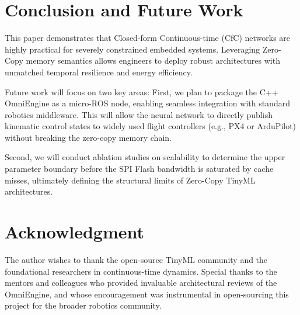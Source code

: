 \documentclass[conference]{IEEEtran}
\begin{document}
\section{Conclusion and Future Work}
This paper demonstrates that Closed-form Continuous-time (CfC) networks are highly practical for severely constrained embedded systems. Leveraging Zero-Copy memory semantics allows engineers to deploy robust architectures with unmatched temporal resilience and energy efficiency. 

Future work will focus on two key areas: First, we plan to package the C++ OmniEngine as a micro-ROS node, enabling seamless integration with standard robotics middleware. This will allow the neural network to directly publish kinematic control states to widely used flight controllers (e.g., PX4 or ArduPilot) without breaking the zero-copy memory chain. 

Second, we will conduct ablation studies on scalability to determine the upper parameter boundary before the SPI Flash bandwidth is saturated by cache misses, ultimately defining the structural limits of Zero-Copy TinyML architectures.

\section*{Acknowledgment}
The author wishes to thank the open-source TinyML community and the foundational researchers in continuous-time dynamics. Special thanks to the mentors and colleagues who provided invaluable architectural reviews of the OmniEngine, and whose encouragement was instrumental in open-sourcing this project for the broader robotics community.
\end{document}

